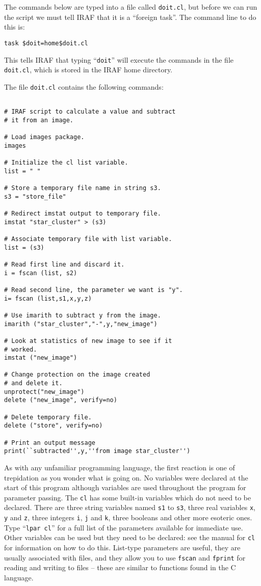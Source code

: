 The commands below are typed into a file called {\tt doit.cl}, but before we
can run the script we must tell IRAF that it is a ``foreign task''. The
command line to do this is:

{\tt task \$doit=home\$doit.cl}

This tells IRAF that typing ``{\tt doit}'' will execute the commands in
the file {\tt doit.cl}, which is stored in the IRAF home directory.

The file {\tt doit.cl} contains the following commands:

{\footnotesize
\begin{verbatim}

# IRAF script to calculate a value and subtract
# it from an image.

# Load images package.
images

# Initialize the cl list variable.
list = " "

# Store a temporary file name in string s3.
s3 = "store_file"

# Redirect imstat output to temporary file.
imstat "star_cluster" > (s3)

# Associate temporary file with list variable.
list = (s3)

# Read first line and discard it.
i = fscan (list, s2)

# Read second line, the parameter we want is "y".
i= fscan (list,s1,x,y,z)

# Use imarith to subtract y from the image.
imarith ("star_cluster","-",y,"new_image")

# Look at statistics of new image to see if it
# worked.
imstat ("new_image")

# Change protection on the image created
# and delete it.
unprotect("new_image")
delete ("new_image", verify=no)

# Delete temporary file.
delete ("store", verify=no)

# Print an output message
print(``subtracted'',y,''from image star_cluster'')

\end{verbatim}
}

As with any unfamiliar programming language, the first reaction is one
of trepidation as you wonder what is going on. No variables were
declared at the start of this program although variables are used
throughout the program for parameter passing. The {\tt cl} has some built-in
variables which do not need to be declared. There are three string
variables named {\tt s1} to {\tt s3}, three real variables
{\tt x}, {\tt y} and {\tt z}, three
integers {\tt i}, {\tt j} and {\tt k},
three booleans and other more esoteric ones. Type
``{\tt lpar cl}'' for a full list of the parameters available for
immediate use. Other variables can be used but they need to be
declared: see the manual for {\tt cl} for information on how to do
this. List-type parameters are useful, they are usually associated
with files, and they allow you to use {\tt fscan} and {\tt fprint}
for reading and
writing to files -- these are similar to functions found in the C
language.

